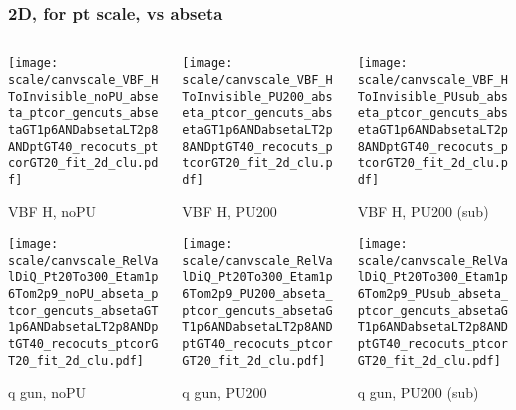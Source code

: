 \documentclass[8pt]{beamer}
\begin{document}
   \begin{frame}
  \frametitle{2D, for pt scale, vs abseta}
  
  \begin{columns}
   \begin{column}{0.35\textwidth}
     \texttt{[image: scale/canvscale\_VBF\_HToInvisible\_noPU\_abseta\_ptcor\_gencuts\_absetaGT1p6ANDabsetaLT2p8ANDptGT40\_recocuts\_ptcorGT20\_fit\_2d\_clu.pdf]}
     
     VBF H, noPU
    
     \texttt{[image: scale/canvscale\_RelValDiQ\_Pt20To300\_Etam1p6Tom2p9\_noPU\_abseta\_ptcor\_gencuts\_absetaGT1p6ANDabsetaLT2p8ANDptGT40\_recocuts\_ptcorGT20\_fit\_2d\_clu.pdf]}
     
     q gun, noPU
   \end{column}
   \begin{column}{0.35\textwidth}
     \texttt{[image: scale/canvscale\_VBF\_HToInvisible\_PU200\_abseta\_ptcor\_gencuts\_absetaGT1p6ANDabsetaLT2p8ANDptGT40\_recocuts\_ptcorGT20\_fit\_2d\_clu.pdf]}
     
     VBF H, PU200
    
     \texttt{[image: scale/canvscale\_RelValDiQ\_Pt20To300\_Etam1p6Tom2p9\_PU200\_abseta\_ptcor\_gencuts\_absetaGT1p6ANDabsetaLT2p8ANDptGT40\_recocuts\_ptcorGT20\_fit\_2d\_clu.pdf]}
     
     q gun, PU200
   \end{column}
   \begin{column}{0.35\textwidth}
     \texttt{[image: scale/canvscale\_VBF\_HToInvisible\_PUsub\_abseta\_ptcor\_gencuts\_absetaGT1p6ANDabsetaLT2p8ANDptGT40\_recocuts\_ptcorGT20\_fit\_2d\_clu.pdf]}
     
     VBF H, PU200 (sub)
    
     \texttt{[image: scale/canvscale\_RelValDiQ\_Pt20To300\_Etam1p6Tom2p9\_PUsub\_abseta\_ptcor\_gencuts\_absetaGT1p6ANDabsetaLT2p8ANDptGT40\_recocuts\_ptcorGT20\_fit\_2d\_clu.pdf]}
     
     q gun, PU200 (sub)
   \end{column}
  \end{columns}
 \end{frame}
 
\end{document}
